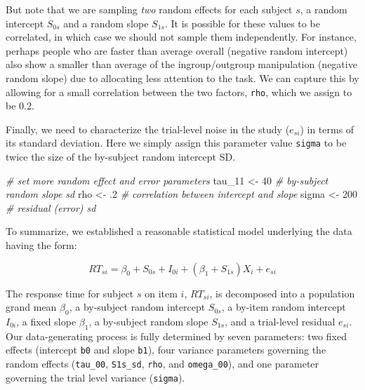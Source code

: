 \documentclass[doc,floatsintext]{apa6}
\newenvironment{Shaded}{\begin{snugshade}}{\end{snugshade}}
\newcommand{\DecValTok}[1]{\textcolor[rgb]{0.00,0.00,0.81}{#1}}
\newcommand{\FloatTok}[1]{\textcolor[rgb]{0.00,0.00,0.81}{#1}}
\newcommand{\StringTok}[1]{\textcolor[rgb]{0.31,0.60,0.02}{#1}}
\newcommand{\CommentTok}[1]{\textcolor[rgb]{0.56,0.35,0.01}{\textit{#1}}}
\newcommand{\NormalTok}[1]{#1}
\begin{document}
But note that we are sampling \emph{two} random effects for each subject
\(s\), a random intercept \(S_{0s}\) and a random slope \(S_{1s}\). It
is possible for these values to be correlated, in which case we should
not sample them independently. For instance, perhaps people who are
faster than average overall (negative random intercept) also show a
smaller than average of the ingroup/outgroup manipulation (negative
random slope) due to allocating less attention to the task. We can
capture this by allowing for a small correlation between the two
factors, \texttt{rho}, which we assign to be 0.2.

Finally, we need to characterize the trial-level noise in the study
(\(e_{si}\)) in terms of its standard deviation. Here we simply assign
this parameter value \texttt{sigma} to be twice the size of the
by-subject random intercept SD.

\begin{Shaded}
\begin{Highlighting}[]
\CommentTok{# set more random effect and error parameters}
\NormalTok{tau_}\DecValTok{11}\NormalTok{ <-}\StringTok{  }\DecValTok{40} \CommentTok{# by-subject random slope sd}
\NormalTok{rho   <-}\StringTok{  }\FloatTok{.2} \CommentTok{# correlation between intercept and slope}
\NormalTok{sigma <-}\StringTok{ }\DecValTok{200} \CommentTok{# residual (error) sd}
\end{Highlighting}
\end{Shaded}

To summarize, we established a reasonable statistical model underlying
the data having the form:

\begin{equation}
RT_{si} = \beta_0 + S_{0s} + I_{0i} + \left(\beta_1 + S_{1s}\right) X_i + e_{si}
\end{equation}

\noindent The response time for subject \(s\) on item \(i\),
\(RT_{si}\), is decomposed into a population grand mean \(\beta_0\), a
by-subject random intercept \(S_{0s}\), a by-item random intercept
\(I_{0i}\), a fixed slope \(\beta_1\), a by-subject random slope
\(S_{1s}\), and a trial-level residual \(e_{si}\). Our data-generating
process is fully determined by seven parameters: two fixed effects
(intercept \texttt{b0} and slope \texttt{b1}), four variance parameters
governing the random effects (\texttt{tau\_00}, \texttt{S1s\_sd},
\texttt{rho}, and \texttt{omega\_00}), and one parameter governing the
trial level variance (\texttt{sigma}).
\end{document}
